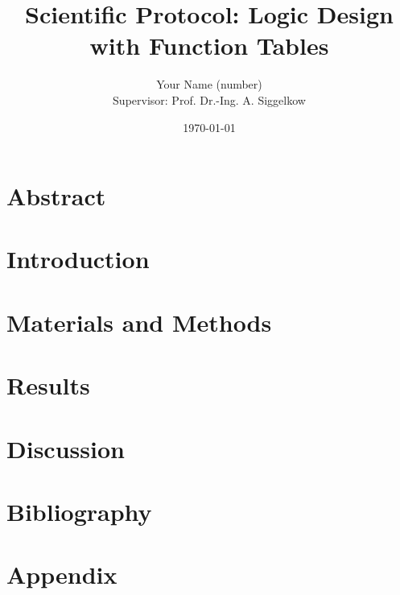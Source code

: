 \documentclass[12pt]{article}
\begin{document}
\title{Scientific Protocol: Logic Design with Function Tables}
\author{Your Name (number)\\[1ex]
Supervisor: Prof. Dr.-Ing. A. Siggelkow}
\date{\today} %

\maketitle

\tableofcontents
\setcounter{page}{1} %

\section{Abstract}
\lipsum[1]  %

\section{Introduction}
\lipsum[2-3]  %

\section{Materials and Methods}
\lipsum[4-5]\cite{ref01}  %

\section{Results}
\lipsum[6-7]\cite{ref02}  %

\section{Discussion}
\lipsum[8-9]\cite{ref03}  %

\section{Bibliography}
\printbibliography[heading=none]

\section{Appendix}
\lipsum[10]
\end{document}
